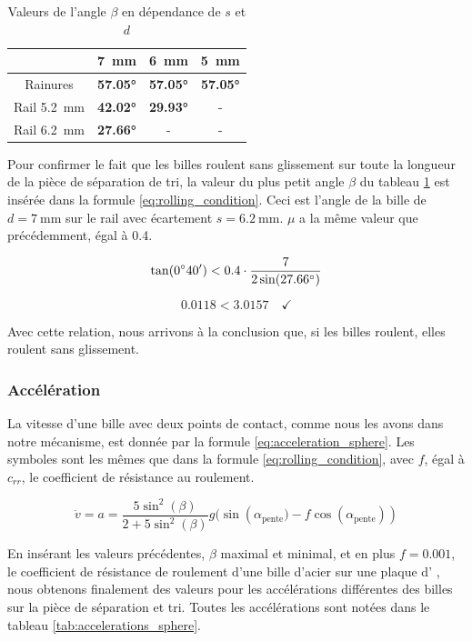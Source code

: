 \begin{table}[htbp]
    \centering
    \begin{tabular}{|c|c|c|c|}
        \hline
         & \SI{7}{\mm} & \SI{6}{\mm} & \SI{5}{\mm} \\
        \hline
        Rainures & \textbf{\ang{57.05}} & \textbf{\ang{57.05}} & \textbf{\ang{57.05}} \\
        \hline
        Rail \SI{5.2}{\mm}& \textbf{\ang{42.02}} & \textbf{\ang{29.93}} & - \\
        \hline
        Rail \SI{6.2}{\mm}& \textbf{\ang{27.66}} & - & - \\
        \hline
    \end{tabular}
    \caption{Valeurs de l'angle $\beta$ en dépendance de $s$ et $d$}
    \label{tab:beta_sphere}
\end{table}

Pour confirmer le fait que les billes roulent sans glissement sur toute la longueur de la pièce de séparation de tri, la valeur du plus petit angle $\beta$ du tableau \ref{tab:beta_sphere} est insérée dans la formule \ref{eq:rolling_condition}. Ceci est l'angle de la bille de $d = \SI{7}{\mm}$ sur le rail avec écartement $s = \SI{6.2}{\mm}$. $\mu$ a la même valeur que précédemment, égal à \num{0.4}.

\[\sisetup{add-arc-degree-zero} \tan(\ang{;40;}) < \num{0.4} \cdot \frac{7}{2\sin(\ang{27.66})}\]

\[\num{0.0118} < \num{3.0157} \quad \checkmark\]

Avec cette relation, nous arrivons à la conclusion que, si les billes roulent, elles roulent sans glissement.

\subsubsection{Accélération}
La vitesse d'une bille avec deux points de contact, comme nous les avons dans notre mécanisme, est donnée par la formule \ref{eq:acceleration_sphere}. Les symboles sont les mêmes que dans la formule \ref{eq:rolling_condition}, avec $f$, égal à $c_{rr}$, le coefficient de résistance au roulement.

\begin{equation}
    \dot{v} = a = \frac{5\sin^{2}(\beta)}{2+5\sin^{2}(\beta)} g(\sin({\alpha_{\text{pente}}) - f\cos(\alpha_{\text{pente}})})
    \label{eq:acceleration_sphere}
\end{equation}

En insérant les valeurs précédentes, $\beta$ maximal et minimal, et en plus $f = \num{0.001}$, le coefficient de résistance de roulement d'une bille d'acier sur une plaque d'%
, nous obtenons finalement des valeurs pour les accélérations différentes des billes sur la pièce de séparation et tri. Toutes les accélérations sont notées dans le tableau \ref{tab:accelerations_sphere}.

